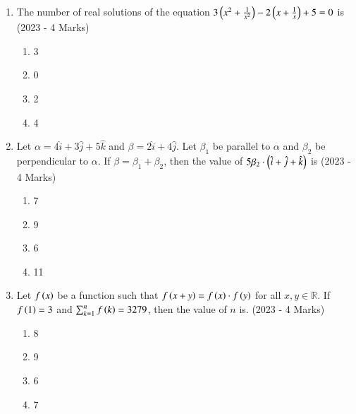\documentclass[journal]{IEEEtran}
\begin{document}
\begin{enumerate}
{        }
 \item{
    	
	    	The number of real solutions of the equation $3\left(x^2 + \frac{1}{x^2}\right) - 2\left(x + \frac{1}{x}\right)+5 =0$ is\\
	    	\text{   }\hfill
	    	{(2023 - 4 Marks)}
	    	\begin{multicols}{4}
	    		\begin{enumerate}
	    			\item 3
	    			\item 0
	    			\item 2
	    			\item 4
	    		\end{enumerate}
	    	\end{multicols}
	    	
	    }
    \item{
	
		    Let
		    $\alpha = 4\hat{i} + 3\hat{j} + 5\hat{k}$
		    and
		    $\beta = 2\hat{i} + 4\hat{j}$.
		    Let
		    $\beta_1$
		    be
		    parallel to
		    $\alpha$
		    and
		    $\beta_2$
		    be perpendicular to
		    $\alpha$.
		    If
		    $\beta = \beta_1 + \beta_2$,
		    then the value of
		    $5\beta_2\cdot\left(\hat{i} + \hat{j} + \hat{k}\right)$
		    is
			\text{   }\hfill
			{(2023 - 4 Marks)}
			\begin{multicols}{4}
				\begin{enumerate}
						\item 7
						\item 9
						\item 6
						\item 11
				\end{enumerate}
			\end{multicols}
			
		}

    \item{
        
            Let $f\left(x\right)$ be a function such that $f\left(x+y\right) = f\left(x\right)\cdot f\left(y\right)$ for all $x, y \in \mathbb{R}$. If $f\left(1\right) = 3$ and $\sum_{k=1}^{n} f\left(k\right) = 3279$, then the value of $n$ is.\text{ }
             \hfill
              {(2023 - 4 Marks)}
			\begin{multicols}{2}              
	              		\begin{enumerate}
	              			\item 8
	              			\item 9
	              			\item 6
	              			\item 7
	              	\end{enumerate}
  			\end{multicols}      
        }
    \end{enumerate}
\end{document}
